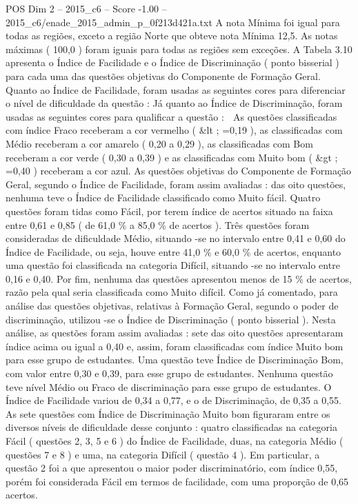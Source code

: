 \begin{textsample}{POS Dim 2 – 2015\_c6 – Score -1.00 – 2015\_c6/enade\_2015\_admin\_p\_0f213d421a.txt}
A nota Mínima foi igual para todas as regiões, exceto a região Norte que obteve nota Mínima 12,5.
As notas máximas ( 100,0 ) foram iguais para todas as regiões sem exceções.
A Tabela 3.10 apresenta o Índice de Facilidade e o Índice de Discriminação ( ponto bisserial ) para cada uma das questões objetivas do Componente de Formação Geral.
Quanto ao Índice de Facilidade, foram usadas as seguintes cores para diferenciar o nível de dificuldade da questão : Já quanto ao Índice de Discriminação, foram usadas as seguintes cores para qualificar a questão :  As questões classificadas com índice Fraco receberam a cor vermelho ( \&lt ; =0,19 ), as classificadas com Médio receberam a cor amarelo ( 0,20 a 0,29 ), as classificadas com Bom receberam a cor verde ( 0,30 a 0,39 ) e as classificadas com Muito bom ( \&gt ; =0,40 ) receberam a cor azul.
As questões objetivas do Componente de Formação Geral, segundo o Índice de Facilidade, foram assim avaliadas : das oito questões, nenhuma teve o Índice de Facilidade classificado como Muito fácil.
Quatro questões foram tidas como Fácil, por terem índice de acertos situado na faixa entre 0,61 e 0,85 ( de 61,0 \% a 85,0 \% de acertos ).
Três questões foram consideradas de dificuldade Médio, situando -se no intervalo entre 0,41 e 0,60 do Índice de Facilidade, ou seja, houve entre 41,0 \% e 60,0 \% de acertos, enquanto uma questão foi classificada na categoria Difícil, situando -se no intervalo entre 0,16 e 0,40.
Por fim, nenhuma das questões apresentou menos de 15 \% de acertos, razão pela qual seria classificada como Muito difícil.
Como já comentado, para análise das questões objetivas, relativas à Formação Geral, segundo o poder de discriminação, utilizou -se o Índice de Discriminação ( ponto bisserial ).
Nesta análise, as questões foram assim avaliadas : sete das oito questões apresentaram índice acima ou igual a 0,40 e, assim, foram classificadas com índice Muito bom para esse grupo de estudantes.
Uma questão teve Índice de Discriminação Bom, com valor entre 0,30 e 0,39, para esse grupo de estudantes.
Nenhuma questão teve nível Médio ou Fraco de discriminação para esse grupo de estudantes.
O Índice de Facilidade variou de 0,34 a 0,77, e o de Discriminação, de 0,35 a 0,55.
As sete questões com Índice de Discriminação Muito bom figuraram entre os diversos níveis de dificuldade desse conjunto : quatro classificadas na categoria Fácil ( questões 2, 3, 5 e 6 ) do Índice de Facilidade, duas, na categoria Médio ( questões 7 e 8 ) e uma, na categoria Difícil ( questão 4 ).
Em particular, a questão 2 foi a que apresentou o maior poder discriminatório, com índice 0,55, porém foi considerada Fácil em termos de facilidade, com uma proporção de 0,65 acertos.

\end{textsample}
